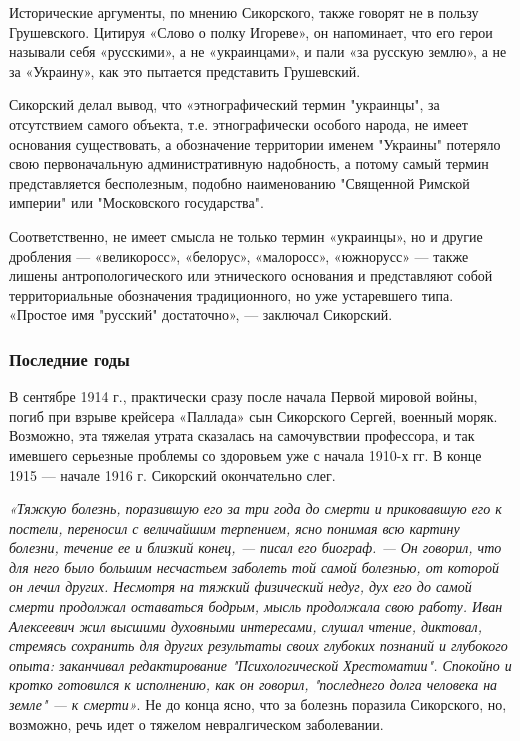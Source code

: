 Исторические аргументы, по мнению Сикорского, также говорят не в пользу
Грушевского. Цитируя «Слово о полку Игореве», он напоминает, что его герои
называли себя «русскими», а не «украинцами», и пали «за русскую землю», а не за
«Украину», как это пытается представить Грушевский.

Сикорский делал вывод, что «этнографический термин "украинцы", за отсутствием
самого объекта, т.е. этнографически особого народа, не имеет основания
существовать, а обозначение территории именем "Украины" потеряло свою
первоначальную административную надобность, а потому самый термин
представляется бесполезным, подобно наименованию "Священной Римской империи"
или "Московского государства".

Соответственно, не имеет смысла не только термин «украинцы», но и другие
дробления — «великоросс», «белорус», «малоросс», «южнорусс» — также лишены
антропологического или этнического основания и представляют собой
территориальные обозначения традиционного, но уже устаревшего типа. «Простое
имя "русский" достаточно», — заключал Сикорский.

\subsubsection{Последние годы}

В сентябре 1914 г., практически сразу после начала Первой мировой войны, погиб
при взрыве крейсера «Паллада» сын Сикорского Сергей, военный моряк. Возможно,
эта тяжелая утрата сказалась на самочувствии профессора, и так имевшего
серьезные проблемы со здоровьем уже с начала 1910-х гг. В конце 1915 — начале
1916 г. Сикорский окончательно слег.

\emph{«Тяжкую болезнь, поразившую его за три года до смерти и приковавшую его к
постели, переносил с величайшим терпением, ясно понимая всю картину болезни,
течение ее и близкий конец, — писал его биограф. — Он говорил, что для него
было большим несчастьем заболеть той самой болезнью, от которой он лечил
других. Несмотря на тяжкий физический недуг, дух его до самой смерти продолжал
оставаться бодрым, мысль продолжала свою работу. Иван Алексеевич жил высшими
духовными интересами, слушал чтение, диктовал, стремясь сохранить для других
результаты своих глубоких познаний и глубокого опыта: заканчивал редактирование
"Психологической Хрестоматии". Спокойно и кротко готовился к исполнению, как он
говорил, "последнего долга человека на земле" — к смерти»}. Не до конца ясно,
что за болезнь поразила Сикорского, но, возможно, речь идет о тяжелом
невралгическом заболевании. 

